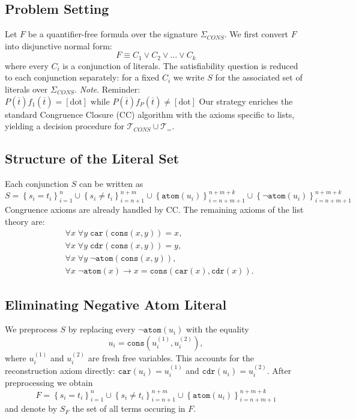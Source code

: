 \documentclass[a4paper]{article}
\theoremstyle{definition}
\begin{document}
\subsection{Problem Setting}
Let \( F \) be a quantifier-free formula over the signature \( \Sigma_{CONS} \). We first convert \( F \) into disjunctive normal form:
\[
  F \equiv C_1 \vee C_2 \vee \ldots \vee C_k
\]
where every \( C_i \) is a conjunction of literals. The satisfiability question is reduced to each conjunction separately:
for a fixed \( C_i \) we write \( S \) for the associated set of literals over \( \Sigma_{CONS} \).
\vspace{1em}
\noindent
\newline
\textit{Note}. Reminder: \( P(\overline{t})f_1(\overline{t}) = [\text{dot}] \text{ while } P(\overline{t})f_P(\overline{t}) \neq [\text{dot}] \)    
\vspace{1em}
\noindent
\newline
Our strategy enriches the standard Congruence Closure (CC) algorithm with the axioms specific to lists, yielding a decision procedure for \( \mathcal{T}_{CONS} \cup \mathcal{T}_{=} \).
\subsection{Structure of the Literal Set}
Each conjunction \( S \) can be written as 
\[
  S = \left\{ s_i = t_i \right\}_{i = 1}^{n} \cup \left\{ s_i \neq t_i \right\}_{i = n + 1}^{n + m} \cup \left\{ \texttt{atom}(u_i) \right\}_{i = n + m + 1}^{n + m + k} \cup \left\{ \lnot \texttt{atom}(u_i) \right\}_{i = n + m + 1}^{n + m + k}
\]
Congruence axioms are already handled by CC. The remaining axioms of the list theory are:
\begin{align*}
	&\forall x\; \forall y\; \texttt{car}(\texttt{cons}(x,y)) = x, \\
	&\forall x\; \forall y\; \texttt{cdr}(\texttt{cons}(x,y)) = y, \\
	&\forall x\; \forall y\; \lnot \texttt{atom}(\texttt{cons}(x,y)), \\
	&\forall x\; \lnot \texttt{atom}(x) \rightarrow x = \texttt{cons}(\texttt{car}(x), \texttt{cdr}(x)).
\end{align*}
\subsection{Eliminating Negative Atom Literal}
We preprocess \( S \) by replacing every \( \lnot \texttt{atom}(u_i) \) with the equality
\[
  u_i = \texttt{cons}(u_i^{(1)}, u_i^{(2)}),
\]
where \( u_i^{(1)} \) and \( u_i^{(2)} \) are fresh free variables. This accounts for the reconstruction axiom directly:
\newline
\( \texttt{car}(u_i) = u_i^{(1)} \) and \( \texttt{cdr}(u_i) = u_i^{(2)} \). After preprocessing we obtain
\[
  F = \left\{ s_i = t_i \right\}_{i = 1}^{n} \cup \left\{ s_i \neq t_i \right\}_{i = n + 1}^{n + m} \cup \left\{ \texttt{atom}(u_i) \right\}_{i = n + m + 1}^{n + m + k}
\]
and denote by \( S_F \) the set of all terms occuring in \( F \).
\end{document}
